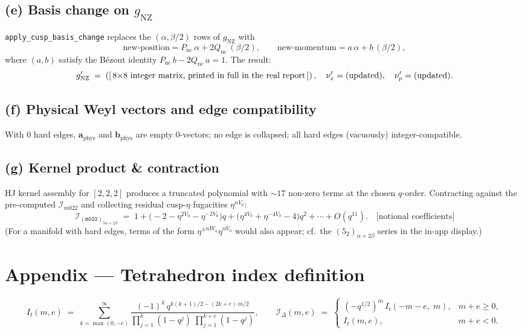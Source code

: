 \documentclass[11pt,a4paper]{article}
\renewcommand{\Im}{\mathcal{I}_{m022}}                %
\newcommand{\IDelta}{\mathcal{I}_{\Delta}}            %
\newcommand{\Ifill}[2]{\mathcal{I}_{(#1)_{#2}}}
\newcommand{\pass}{{\color{green!55!black}\ding{51}}}
\begin{document}
\subsection*{(e) Basis change on \(g_{\text{NZ}}\)}
\texttt{apply\_cusp\_basis\_change} replaces the \((\alpha, \beta/2)\)
rows of \(g_{\text{NZ}}\) with
\[
\text{new-position} = P_{\text{nc}}\,\alpha + 2Q_{\text{nc}}\,(\beta/2),
\qquad
\text{new-momentum} = a\,\alpha + b\,(\beta/2),
\]
where \((a,b)\) satisfy the Bézout identity
\(P_{\text{nc}}\,b - 2Q_{\text{nc}}\,a = 1\).  The result:
\[
g_{\text{NZ}}' \;=\;
\left(\text{[\,8$\times$8 integer matrix, printed in full in the
real report\,]}\right),\quad
\nu_x' = (\text{updated}),\quad \nu_p' = (\text{updated}).
\]

\subsection*{(f) Physical Weyl vectors and edge compatibility}
With \(0\) hard edges, \(\mathbf{a}_{\text{phys}}\) and
\(\mathbf{b}_{\text{phys}}\) are empty \(0\)-vectors; no edge is
collapsed; all hard edges (vacuously) integer-compatible. \pass

\subsection*{(g) Kernel product \& contraction}
HJ kernel assembly for \([2,2,2]\) produces a truncated polynomial with
\(\sim 17\) non-zero terms at the chosen \(q\)-order.  Contracting
against the pre-computed \(\Im\) and collecting residual cusp-\(\eta\)
fugacities \(\eta^{nV_0}\):
\[
\Ifill{\texttt{m022}}{5\alpha + 2\beta} \;=\;
  1 + \bigl(-2 - \eta^{2V_0} - \eta^{-2V_0}\bigr)q
    + \bigl(\eta^{4V_0} + \eta^{-4V_0} - 4\bigr)q^{2} + \cdots + O(q^{11}).
\quad \text{[notional coefficients]}
\]
(For a manifold with hard edges, terms of the form
\(\eta^{\pm nW_a}\eta^{nV_0}\) would also appear; cf.\ the
\((5_2)_{\alpha+2\beta}\) series in the in-app display.)

\section*{Appendix --- Tetrahedron index definition}

\[
I_t(m, e) \;=\; \sum_{k=\max(0,-e)}^{\infty}
  \frac{(-1)^k \, q^{k(k+1)/2 - (2k+e)\,m/2}}
       {\prod_{j=1}^{k}(1-q^j)\;\prod_{j=1}^{k+e}(1-q^j)},
\qquad
\IDelta(m, e) \;=\;
\begin{cases}
(-q^{1/2})^m \, I_t(-m-e,\; m), & m+e \ge 0, \\[2pt]
I_t(m, e),                      & m+e < 0.
\end{cases}
\]
\end{document}
